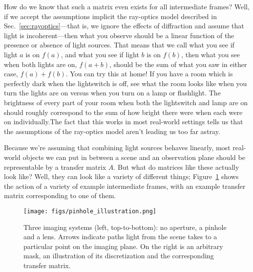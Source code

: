 How do we know that such a matrix even exists for all intermediate frames? Well, if we accept the assumptions implicit the ray-optics model described in Sec.~\ref{sec:rayoptics}---that is, we ignore the effects of diffraction and assume that light is incoherent---then what you observe should be a linear function of the presence or absence of light sources. That means that we call what you see if light $a$ is on $f(a)$, and what you see if light $b$ is on $f(b)$, then what you see when both lights are on, $f(a+b)$, should be the sum of what you saw in either case, $f(a) + f(b)$. You can try this at home! If you have a room which is perfectly dark when the lightswitch is off, see what the room looks like when you turn the lights are on versus when you turn on a lamp or flashlight. The brightness of every part of your room when both the lightswitch and lamp are on should roughly correspond to the sum of how bright there were when each were on individually.\footnotemark The fact that this works in most real-world settings tells us that the assumptions of the ray-optics model aren't leading us too far astray.


Because we're assuming that combining light sources behaves linearly, most real-world objects we can put in between a scene and an observation plane should be representable by a transfer matrix $A$. But what do matrices like these actually look like? Well, they can look like a variety of different things; Figure~\ref{fig:transfermatexample} shows the action of a variety of example intermediate frames, with an example transfer matrix corresponding to one of them.

\begin{figure}
\begin{center}
\texttt{[image: figs/pinhole\_illustration.png]}
\caption{Three imaging systems (left, top-to-bottom): no aperture, a pinhole and a lens. Arrows indicate paths light from the scene takes to a particular point on the imaging plane. On the right is an arbitrary mask, an illustration of its discretization and the corresponding transfer matrix. \label{fig:transfermatexample}}
\end{center}
\end{figure}

